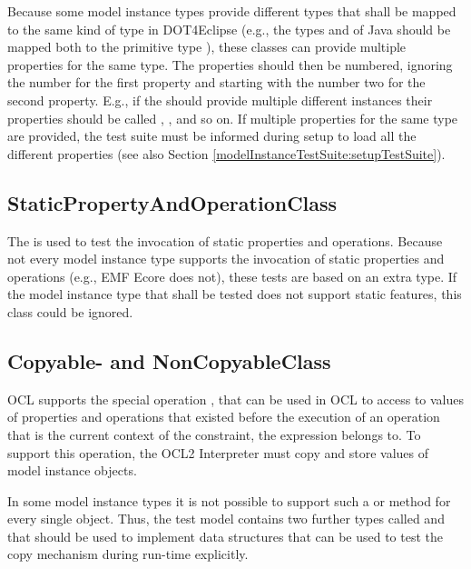 Because some model instance types provide different types that shall be mapped to the same kind of type in \acl{DOT4Eclipse} (e.g., the types  and  of Java should be mapped both to the primitive type ), these classes can provide multiple properties for the same type. The properties should then be numbered, ignoring the number for the first property and starting with the number two for the second property. E.g., if the  should provide multiple different  instances their properties should be called , ,  and so on. If multiple properties for the same type are provided, the test suite must be informed during setup to load all the different properties (see also Section \ref{modelInstanceTestSuite:setupTestSuite}).


\subsection{StaticPropertyAndOperationClass}

The  is used to test the invocation of static properties and operations. Because not every model instance type supports the invocation of static properties and operations (e.g., \acs{EMF} Ecore does not), these tests are based on an extra type. If the model instance type that shall be tested does not support static features, this class could be ignored.


\subsection{Copyable- and NonCopyableClass}

\acs{OCL} supports the special operation , that can be used in \acs{OCL} to access to values of properties and operations that existed before the execution of an operation that is the current context of the constraint, the  expression belongs to. To support this operation, the \acs{OCL}2 Interpreter must copy and store values of model instance objects. 

In some model instance types it is not possible to support such a  or  method for every single object. Thus, the test model contains two further types called  and  that should be used to implement data structures that can be used to test the copy mechanism during run-time explicitly.



